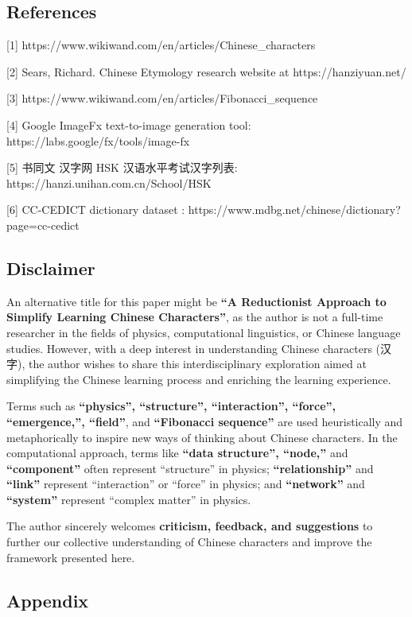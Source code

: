 \documentclass[
  11pt,
  letterpaper,
]{article}
\begin{document}
\subsection{References}\label{references}

{[}1{]} https://www.wikiwand.com/en/articles/Chinese\_characters

{[}2{]} Sears, Richard. Chinese Etymology research website at
https://hanziyuan.net/

{[}3{]} https://www.wikiwand.com/en/articles/Fibonacci\_sequence

{[}4{]} Google ImageFx text-to-image generation tool:
https://labs.google/fx/tools/image-fx

{[}5{]} 书同文 汉字网 HSK 汉语水平考试汉字列表:
https://hanzi.unihan.com.cn/School/HSK

{[}6{]} CC-CEDICT dictionary dataset :
https://www.mdbg.net/chinese/dictionary?page=cc-cedict

\subsection{Disclaimer}\label{disclaimer}

An alternative title for this paper might be \textbf{``A Reductionist
Approach to Simplify Learning Chinese Characters''}, as the author is
not a full-time researcher in the fields of physics, computational
linguistics, or Chinese language studies. However, with a deep interest
in understanding Chinese characters (汉字), the author wishes to share
this interdisciplinary exploration aimed at simplifying the Chinese
learning process and enriching the learning experience.

Terms such as \textbf{``physics'', ``structure'', ``interaction'',
``force'', ``emergence,'', ``field''}, and \textbf{``Fibonacci
sequence''} are used heuristically and metaphorically to inspire new
ways of thinking about Chinese characters. In the computational
approach, terms like \textbf{``data structure'', ``node,''} and
\textbf{``component''} often represent ``structure'' in physics;
\textbf{``relationship''} and \textbf{``link''} represent
``interaction'' or ``force'' in physics; and \textbf{``network''} and
\textbf{``system''} represent ``complex matter'' in physics.

The author sincerely welcomes \textbf{criticism, feedback, and
suggestions} to further our collective understanding of Chinese
characters and improve the framework presented here.

\subsection{Appendix}\label{appendix}
\end{document}
